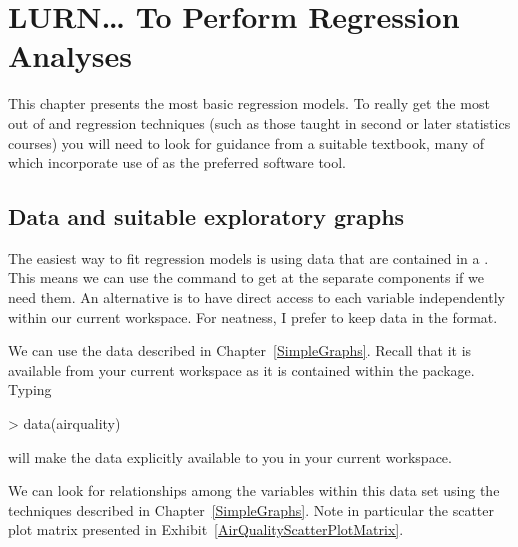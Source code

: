 



\chapter{LURN\ldots{} To Perform Regression Analyses} 
\label{Regression} 
 
 



 
This chapter presents the most basic regression models. To really get the most out of \R{} and regression techniques (such as those taught in second or later statistics courses) you will need to look for guidance from a suitable textbook, many of which incorporate use of \R{} as the preferred software tool. 
 
\section{Data and suitable exploratory graphs} 
 
The easiest way to fit regression models is using data that are contained in a . This means we can use the  command to get at the separate components if we need them. An alternative is to have direct access to each variable independently within our current workspace. For neatness, I prefer to keep data in the  format. 
 
We can use the  data described in Chapter~\ref{SimpleGraphs}. Recall that it is available from your current workspace as it is contained within the  package. Typing 

\begin{Schunk}
\begin{Sinput}
> data(airquality) 
\end{Sinput}
\end{Schunk}

will make the data explicitly available to you in your current \R{} workspace. 
 
We can look for relationships among the variables within this data set using the techniques described in Chapter~\ref{SimpleGraphs}. Note in particular the scatter plot matrix presented in Exhibit~\ref{AirQualityScatterPlotMatrix}. 
 
